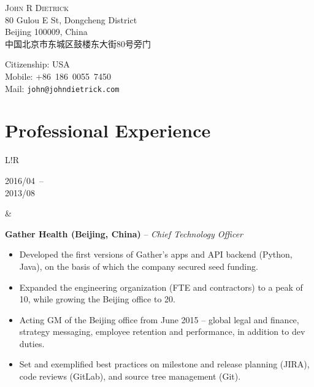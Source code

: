\documentclass[10pt]{article}
\makeatletter
\newcommand\VRule{\color{lightgray}\vrule width 0.5pt}
\def\spaceBeforeExperienceBullets{\vspace{-10pt}}
\def\fullName{John R Dietrick}
\def\englishAddressLineOne{80 Gulou E St, Dongcheng District}
\def\englishAddressLineTwo{Beijing 100009, China}
\def\chineseAddress{中国北京市东城区鼓楼东大街80号旁门}
\def\citizenship{USA}
\def\mobileNumber{+86~186~0055~7450}
\def\emailAddress{john@johndietrick.com}
\makeatother
\begin{document}
\begin{CJK}{UTF8}{gbsn}

\vspace{0pt}
\begin{center}
    \flushleft
    \begin{minipage}[b]{0.45\linewidth}
        \vspace{0pt}
        {\huge\textsc{\fullName}}\\
        \englishAddressLineOne\\
        \englishAddressLineTwo
        \ifx\USAVERSION\undefined
            \\\chineseAddress
        \fi
    \end{minipage}
    \begin{minipage}[b]{0.45\linewidth}
        \vspace{0pt}
        Citizenship: \citizenship\\
        Mobile: \mobileNumber\\
        Mail: \texttt{\emailAddress}
    \end{minipage}
\end{center}

\vspace{-6pt}

\section*{Professional Experience}
\begin{tabular}{L!{\VRule}R}
    \parbox[t]{1.0\linewidth}{
        {\scriptsize 2016/04}~--\\
        {\scriptsize 2013/08}
    }&
    \parbox[t]{1.0\linewidth}{
        {\bf Gather Health (Beijing, China)} -- \textit{Chief Technology Officer}\\
        \spaceBeforeExperienceBullets
        \begin{itemize}[leftmargin=16pt]
            \item Developed the first versions of Gather's apps and API backend (Python, Java), on the basis of which the company secured seed funding.
            \item Expanded the engineering organization (FTE and contractors) to a peak of 10, while growing the Beijing office to 20.
            \item Acting GM of the Beijing office from June 2015 -- global legal and finance, strategy messaging, employee retention and performance, in addition to dev duties.
            \item Set and exemplified best practices on milestone and release planning (JIRA), code reviews (GitLab), and source tree management (Git).
        \end{itemize}
    }\\


\end{tabular}
\end{CJK}
\end{document}
